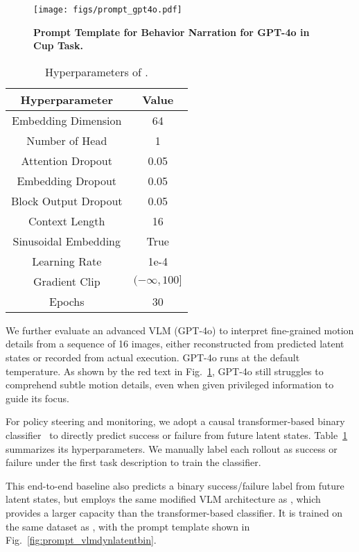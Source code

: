  
    \begin{figure}[h!]
        \centering
        \texttt{[image: figs/prompt\_gpt4o.pdf]}
        \caption{\textbf{Prompt Template for Behavior Narration for GPT-4o in Cup Task.}}
        \label{fig:prompt_gpt4o}
    \end{figure}
       \begin{table}[h!]
    \centering 
    \begin{tabular}{c|c}
   Hyperparameter & Value  \\
        \hline
        Embedding Dimension & 64 \\
        Number of Head & 1 \\
        Attention Dropout & 0.05\\
        Embedding Dropout & 0.05 \\
        Block Output Dropout & 0.05 \\
        Context Length & 16 \\
        Sinusoidal Embedding & True \\
        Learning Rate & 1e-4\\
        Gradient Clip & $(-\infty , 100]$ \\
        Epochs & 30 \\
        
        \hline
    \end{tabular}
    \caption{Hyperparameters of \classdynlatent.}
    \label{tab:classifier}
    \end{table}
    \para{\vlmimg \& \vlmimgoracle} We further evaluate an advanced VLM (GPT-4o) to interpret fine-grained motion details from a sequence of 16 images, either reconstructed from predicted latent states or recorded from actual execution. GPT-4o runs at the default temperature. As shown by the red text in Fig.~\ref{fig:prompt_gpt4o}, GPT-4o still struggles to comprehend subtle motion details, even when given privileged information to guide its focus.
   
 
    
    \para{\classdynlatent} For policy steering and monitoring, we adopt a causal transformer-based binary classifier~\citep{liumulti} to directly predict success or failure from future latent states. Table~\ref{tab:classifier} summarizes its hyperparameters. We manually label each rollout as success or failure under the first task description to train the classifier.
    
    \para{\vlmdynlatentbin}  This end-to-end baseline also predicts a binary success/failure label from future latent states, but employs the same modified VLM architecture as \ours, which provides a larger capacity than the transformer-based classifier. It is trained on the same dataset as \classdynlatent, with the prompt template shown in Fig.~\ref{fig:prompt_vlmdynlatentbin}.


